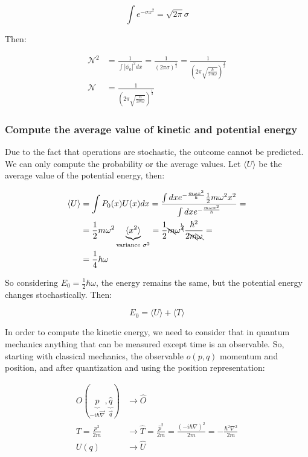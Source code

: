     $$\int e^{-\sigma x^2} = \sqrt{2\pi}\sigma$$

    Then:

    \begin{align*}
      \mathcal{N}^2 &= \frac{1}{\int|\phi_0|^2dx} = \frac{1}{(2\pi\sigma)^{\frac{1}{2}}} = \frac{1}{(2\pi\sqrt{\frac{\hbar}{2m\omega}})^\frac{1}{2}}\\
      \mathcal{N} &= \frac{1}{(2\pi\sqrt{\frac{\hbar}{2m\omega}})^{\frac{1}{4}}}
    \end{align*}

    \subsubsection{Compute the average value of kinetic and potential energy}
    Due to the fact that operations are stochastic, the outcome cannot be predicted. We can only compute the probability or the average values.
    Let $\langle U\rangle $ be the average value of the potential energy, then:

    \begin{align*}
      \langle U\rangle  &= \int P_0(x)U(x)dx = \frac{\int dx e^{-\frac{m\omega x^2}{\hbar}}\frac{1}{2}m\omega^2x^2}{\int dx e^{-\frac{m\omega x^2}{\hbar}}} =\\
          &= \frac{1}{2}m\omega^2\underbrace{\langle x^2\rangle }_{\text{variance }\sigma^2} = \frac{1}{2}\bcancel{m}\omega^{\bcancel{2}}\frac{\hbar^2}{2\bcancel{m}\bcancel{\omega}}=\\
          &=\frac{1}{4}\hbar\omega
    \end{align*}

    So considering $E_0 = \frac{1}{2}\hbar\omega$, the energy remains the same, but the potential energy changes stochastically. Then:

    $$E_0 = \langle U\rangle  + \langle T\rangle $$

    In order to compute the kinetic energy, we need to consider that in quantum mechanics anything that can be measured except time is an observable.
    So, starting with classical mechanics, the observable $o(p,q)$ momentum and position, and after quantization and using the position representation:

    \begin{align*}
      O(\underbrace{\hat{p}}_{-i\hbar\vec{\nabla}},\underbrace{\hat{q}}_{\vec{q}}) &\rightarrow \hat{O}\\
      T = \frac{p^2}{2m}&\rightarrow \hat{T} = \frac{\hat{p}^2}{2m} = \frac{(-i\hbar\nabla)^2}{2m} = -\frac{\hbar^2\nabla^2}{2m}\\
      U(q)&\rightarrow \hat{U}
    \end{align*}

